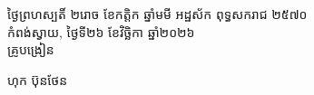 \documentclass[a4paper,10pt]{article}
\begin{document}
\vspace{6pt}
\hfill
\begin{minipage}{10.5cm}
  {\centering
    ថ្ងៃព្រហស្បតិ៍ ២រោច ខែកត្តិក ឆ្នាំមមី អដ្ឋស័ក ពុទ្ធសករាជ ២៥៧០\\[2pt]
    កំពង់ស្វាយ, ថ្ងៃទី២៦ ខែវិច្ឆិកា ឆ្នាំ២០២៦\\[3pt]
    {\muol គ្រូបង្រៀន}\par}
  \vspace{28pt}
  \hfill{\muol ហុក ប៊ុនថែន}\hspace*{1.4cm}
\end{minipage}
\end{document}
